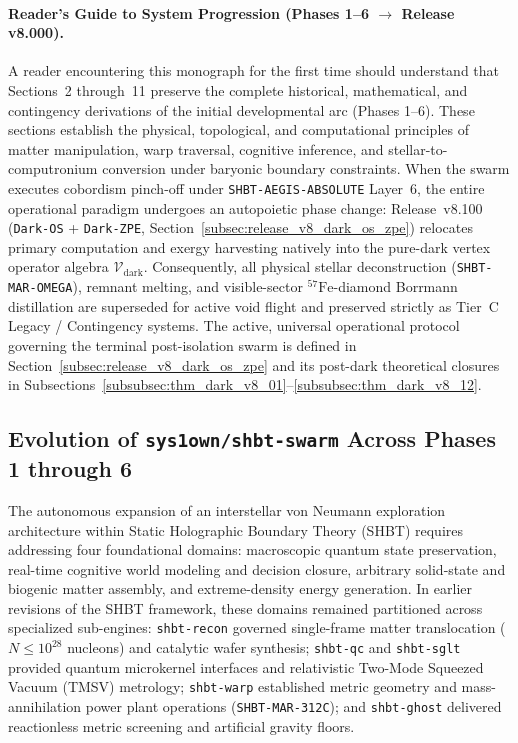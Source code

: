 \documentclass[11pt,onecolumn]{article}
\begin{document}
\paragraph{Reader's Guide to System Progression (Phases 1--6 $\to$ Release v8.000).}
A reader encountering this monograph for the first time should understand that Sections~2 through~11 preserve the complete historical, mathematical, and contingency derivations of the initial developmental arc (Phases 1--6). These sections establish the physical, topological, and computational principles of matter manipulation, warp traversal, cognitive inference, and stellar-to-computronium conversion under baryonic boundary constraints. When the swarm executes cobordism pinch-off under \texttt{SHBT-AEGIS-ABSOLUTE} Layer~6, the entire operational paradigm undergoes an autopoietic phase change: Release~v8.100 (\texttt{Dark-OS} + \texttt{Dark-ZPE}, Section~\ref{subsec:release_v8_dark_os_zpe}) relocates primary computation and exergy harvesting natively into the pure-dark vertex operator algebra $\mathcal{V}_{\text{dark}}$. Consequently, all physical stellar deconstruction (\texttt{SHBT-MAR-OMEGA}), remnant melting, and visible-sector $^{57}\text{Fe}$-diamond Borrmann distillation are superseded for active void flight and preserved strictly as Tier~C Legacy / Contingency systems. The active, universal operational protocol governing the terminal post-isolation swarm is defined in Section~\ref{subsec:release_v8_dark_os_zpe} and its post-dark theoretical closures in Subsections~\ref{subsubsec:thm_dark_v8_01}--\ref{subsubsec:thm_dark_v8_12}.


\subsection{Evolution of \texttt{sys1own/shbt-swarm} Across Phases 1 through 6}
The autonomous expansion of an interstellar von Neumann exploration architecture within Static Holographic Boundary Theory (SHBT) requires addressing four foundational domains: macroscopic quantum state preservation, real-time cognitive world modeling and decision closure, arbitrary solid-state and biogenic matter assembly, and extreme-density energy generation. In earlier revisions of the SHBT framework, these domains remained partitioned across specialized sub-engines: \texttt{shbt-recon} governed single-frame matter translocation ($N \le 10^{28}$ nucleons) and catalytic wafer synthesis; \texttt{shbt-qc} and \texttt{shbt-sglt} provided quantum microkernel interfaces and relativistic Two-Mode Squeezed Vacuum (TMSV) metrology; \texttt{shbt-warp} established metric geometry and mass-annihilation power plant operations (\texttt{SHBT-MAR-312C}); and \texttt{shbt-ghost} delivered reactionless metric screening and artificial gravity floors.
\end{document}
